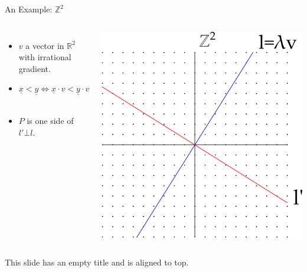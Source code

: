 \documentclass{beamer}
\begin{document}
\begin{frame}{An Example: $\mathbb{Z}^2$}
\begin{columns}
	\begin{itemize}
	\item $v$ a vector in $\mathbb{R}^2$ with irrational gradient.
	
	\item $\underline{x}<\underline{y} \iff \underline{x} \cdot v < \underline{y} \cdot v$\

	\item $P$ is one side of $l' \bot l$.
	\end{itemize}
	\includegraphics[width=\linewidth]{Z2Poscone.png}
\end{columns}
\end{frame}

\begin{frame}[t]
	This slide has an empty title and is aligned to top.
\end{frame}
\end{document}
